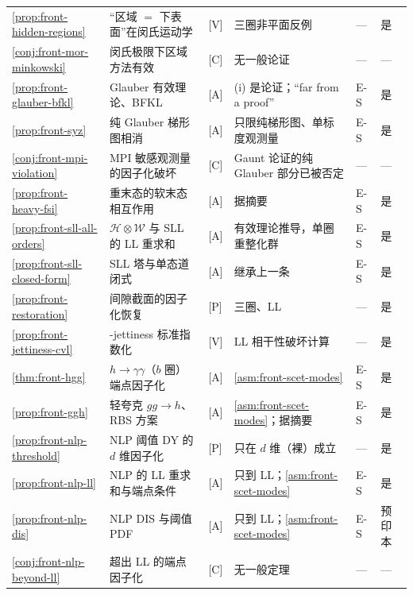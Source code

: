 \begin{table}[htbp]
\begin{tabularx}{\textwidth}{@{}p{1.75cm}>{\raggedright\arraybackslash}Xp{1.35cm}>{\raggedright\arraybackslash}p{3.6cm}p{0.75cm}p{0.95cm}@{}}
\cref{prop:front-hidden-regions} & “区域 $=$ 下表面”在闵氏运动学 & [V] & 三圈非平面反例 & — & 是 \\
\cref{conj:front-mor-minkowski} & 闵氏极限下区域方法有效 & [C] & 无一般论证 & — & — \\
\cref{prop:front-glauber-bfkl} & Glauber 有效理论、BFKL & [A] & (i) 是论证；“far from a proof” & E-S & 是 \\
\cref{prop:front-syz} & 纯 Glauber 梯形图相消 & [A] & 只限纯梯形图、单标度观测量 & E-S & 是 \\
\cref{conj:front-mpi-violation} & MPI 敏感观测量的因子化破坏 & [C] & Gaunt 论证的纯 Glauber 部分已被否定 & — & — \\
\cref{prop:front-heavy-fsi} & 重末态的软末态相互作用 & [A] & 据摘要 & E-S & 是 \\
\cref{prop:front-sll-all-orders} & $\mathcal H\otimes\mathcal W$ 与 SLL 的 LL 重求和 & [A] & 有效理论推导，单圈重整化群 & E-S & 是 \\
\cref{prop:front-sll-closed-form} & SLL 塔与单态道闭式 & [A] & 继承上一条 & E-S & 是 \\
\cref{prop:front-restoration} & 间隙截面的因子化恢复 & [P] & 三圈、LL & — & 是 \\
\cref{prop:front-jettiness-cvl} & 1-jettiness 标准指数化 & [V] & LL 相干性破坏计算 & — & 是 \\
\cref{thm:front-hgg} & $h\to\gamma\gamma$（$b$ 圈）端点因子化 & [A] & \cref{asm:front-scet-modes} & E-S & 是 \\
\cref{prop:front-ggh} & 轻夸克 $gg\to h$、RBS 方案 & [A] & \cref{asm:front-scet-modes}；据摘要 & E-S & 是 \\
\cref{prop:front-nlp-threshold} & NLP 阈值 DY 的 $d$ 维因子化 & [P] & 只在 $d$ 维（裸）成立 & — & 是 \\
\cref{prop:front-nlp-ll} & NLP 的 LL 重求和与端点条件 & [A] & 只到 LL；\cref{asm:front-scet-modes} & E-S & 是 \\
\cref{prop:front-nlp-dis} & NLP DIS 与阈值 PDF & [A] & 只到 LL；\cref{asm:front-scet-modes} & E-S & 预印本 \\
\cref{conj:front-nlp-beyond-ll} & 超出 LL 的端点因子化 & [C] & 无一般定理 & — & — \\
\bottomrule
\end{tabularx}
\end{table}


